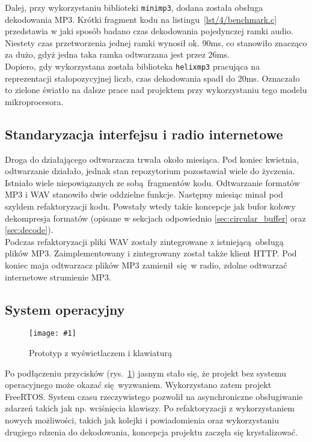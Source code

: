 \documentclass[polish]{aghengthesis}
\newcommand{\imgint}[4]{
	\begin{figure}[{#4}]
		\centering
		\texttt{[image: \#1]}
		\caption{#2}
		\label{#1}
	\end{figure}
}
\newcommand{\imgh}[3]{\imgint{#1}{#2}{#3}{H}}
\begin{document}
			Dalej, przy wykorzystaniu biblioteki \lstinline|minimp3|\textsuperscript{\cite{minimp3}}, dodana została obsługa dekodowania MP3. Krótki fragment kodu na listingu~\ref{lst/4/benchmark.c} przedstawia w jaki sposób badano czas dekodowania pojedynczej ramki audio. Niestety czas przetworzenia jednej ramki wynosił ok. 90ms, co stanowiło znacząco za dużo, gdyż jedna taka ramka odtwarzana jest przez 26ms.
			$ $\\
			
			Dopiero, gdy wykorzystana została biblioteka \lstinline|helixmp3| pracująca na reprezentacji stałopozycyjnej liczb, czas dekodowania spadł do 20ms. Oznaczało to zielone światło na dalsze prace nad projektem przy wykorzystaniu tego modelu mikroprocesora.
			
		\subsection{Standaryzacja interfejsu i radio internetowe}
			Droga do działającego odtwarzacza trwała około miesiąca. Pod koniec kwietnia, odtwarzanie działało, jednak stan repozytorium pozostawiał wiele do życzenia. Istniało wiele niepowiązanych ze sobą fragmentów kodu. Odtwarzanie formatów MP3 i WAV stanowiło dwie oddzielne funkcje. Następny miesiąc minał pod szyldem refaktoryzacji kodu. Powstały wtedy takie koncepcje jak bufor kołowy dekompresja formatów (opisane w sekcjach odpowiednio \ref{sec:circular_buffer} oraz \ref{sec:decode}).
			$ $\\
			
			Podczas refaktoryzacji pliki WAV zostały zintegrowane z istniejącą obsługą plików MP3. Zaimplementowany i zintegrowany został także klient HTTP. Pod koniec maja odtwarzacz plików MP3 zamienił się w radio, zdolne odtwarzać internetowe strumienie MP3.
			
		\subsection{System operacyjny}
			\imgh{4/prototype_2}{Prototyp z wyświetlaczem i klawiaturą}{0.8}
		
			Po podłączeniu przycisków (rys.~\ref{4/prototype_2}) jasnym stało się, że projekt bez systemu operacyjnego może okazać się wyzwaniem. Wykorzystano zatem projekt FreeRTOS. System czasu rzeczywistego pozwolił na asynchroniczne obsługiwanie zdarzeń takich jak np. wciśnięcia klawiszy. Po refaktoryzacji z wykorzystaniem nowych możliwości, takich jak kolejki i powiadomienia oraz wykorzystaniu drugiego rdzenia do dekodowania, koncepcja projektu zaczęła się krystalizować.
			
\end{document}
